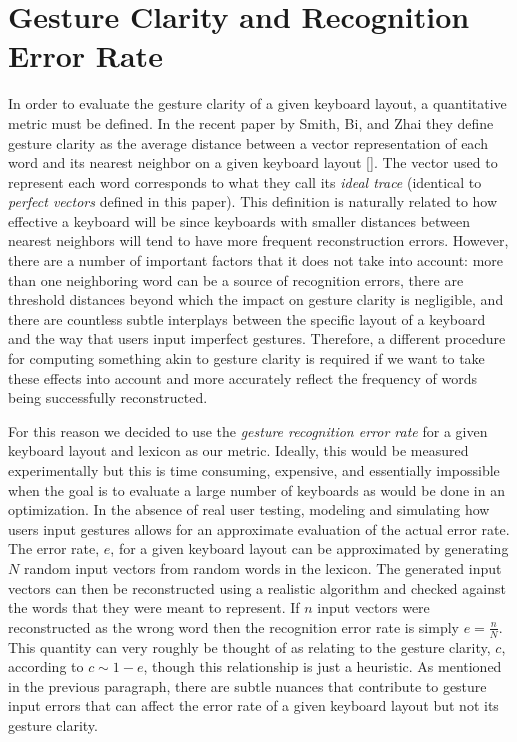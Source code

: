 \documentclass[final,1p,times,authoryear]{elsarticle}
\begin{document}
\section{\textbf{Gesture Clarity and Recognition Error Rate}}\label{sec:gcMethods}
In order to evaluate the gesture clarity of a given keyboard layout, a quantitative metric
must be defined. In the recent paper by Smith, Bi, and Zhai they define gesture clarity as
the average distance between a vector representation of each word and its nearest neighbor on a given keyboard layout [\cite{googleKeyboard}].
The vector used to represent each word corresponds to what they call its \textit{ideal trace} (identical to \textit{perfect vectors} defined in this paper).
This definition is naturally related to how effective a keyboard will be since keyboards with smaller distances between nearest neighbors will tend to have more frequent reconstruction errors.
However, there are a number of important factors that it does not take into account:
more than one neighboring word can be a source of recognition errors, there are threshold distances beyond which the impact on gesture clarity is negligible, and there are countless subtle interplays between the specific layout of a keyboard and the way that users input imperfect gestures.
Therefore, a different procedure for computing something akin to gesture clarity is required if we want to take these effects into account and more accurately reflect the frequency of words being successfully reconstructed.

For this reason we decided to use the \textit{gesture recognition error rate} for a given keyboard layout and lexicon as our metric.
Ideally, this would be measured experimentally but this is time consuming, expensive, and essentially impossible when the goal is to evaluate a large number of keyboards as would be done in an optimization.
In the absence of real user testing, modeling and simulating how users input gestures allows for an approximate evaluation of the actual error rate.
The error rate, $e$, for a given keyboard layout can be approximated by generating $N$ random input vectors from random words in the lexicon.
The generated input vectors can then be reconstructed using a realistic algorithm and checked against the words that they were meant to represent.
If $n$ input vectors were reconstructed as the wrong word then the recognition error rate is simply $e = \frac{n}{N}$.
This quantity can very roughly be thought of as relating to the gesture clarity, $c$, according to $c\sim1-e$, though this relationship is just a heuristic. As mentioned in the previous paragraph, there are subtle nuances that contribute to gesture input errors that can affect the error rate of a given keyboard layout but not its gesture clarity.
\end{document}
